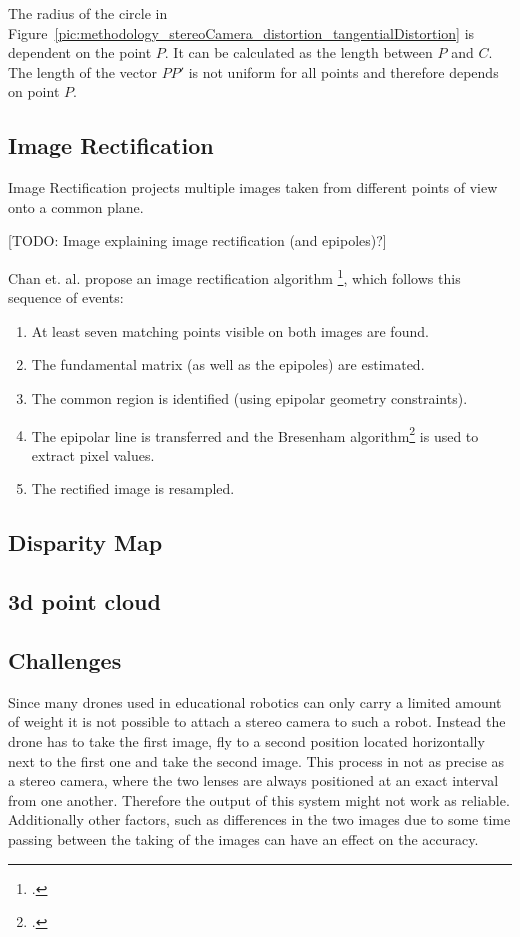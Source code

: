The radius of the circle in Figure~\ref{pic:methodology_stereoCamera_distortion_tangentialDistortion} is dependent on the point $P$. It can be calculated as the length between $P$ and $C$. The length of the vector $PP'$ is not uniform for all points and therefore depends on point $P$.

\subsection{Image Rectification}
Image Rectification projects multiple images taken from different points of view onto a common plane. 

[TODO: Image explaining image rectification (and epipoles)?]

Chan et. al. propose an image rectification algorithm \footcite{Chen_New_Image_Rectification_Algorithm}, which follows this sequence of events:

\begin{enumerate}
	\item At least seven matching points visible on both images are found.
	\item The fundamental matrix (as well as the epipoles) are estimated.
	\item The common region is identified (using epipolar geometry constraints).
	\item The epipolar line is transferred and the Bresenham algorithm\footcite{Bresenham_Linear_Algorithm_For_Incremental_Digital_Display_Of_Circular_Arcs} is used to extract pixel values.
	\item The rectified image is resampled.
\end{enumerate}

\subsection{Disparity Map}

\subsection{3d point cloud}

\subsection{Challenges}
Since many drones used in educational robotics can only carry a limited amount of weight it is not possible to attach a stereo camera to such a robot. Instead the drone has to take the first image, fly to a second position located horizontally next to the first one and take the second image. This process in not as precise as a stereo camera, where the two lenses are always positioned at an exact interval from one another. Therefore the output of this system might not work as reliable. Additionally other factors, such as differences in the two images due to some time passing between the taking of the images can have an effect on the accuracy.

